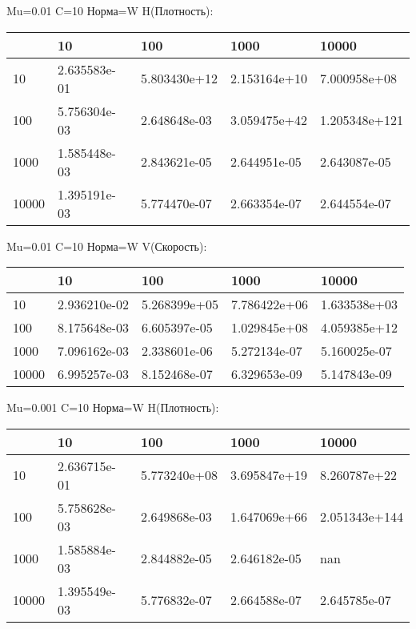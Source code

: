 \documentclass[a4paper, 12pt]{article}
\begin{document}
\bigskip
\bigskip
\bigskip


Mu=0.01  C=10 Норма=W H(Плотность):


\begin{tabular}{lllll}
\toprule
{} &         10    &         100   &         1000  &          10000 \\
\midrule
10    &  2.635583e-01 &  5.803430e+12 &  2.153164e+10 &   7.000958e+08 \\
100   &  5.756304e-03 &  2.648648e-03 &  3.059475e+42 &  1.205348e+121 \\
1000  &  1.585448e-03 &  2.843621e-05 &  2.644951e-05 &   2.643087e-05 \\
10000 &  1.395191e-03 &  5.774470e-07 &  2.663354e-07 &   2.644554e-07 \\
\bottomrule
\end{tabular}



\bigskip
\bigskip
\bigskip


Mu=0.01  C=10 Норма=W V(Скорость):


\begin{tabular}{lllll}
\toprule
{} &         10    &         100   &         1000  &         10000 \\
\midrule
10    &  2.936210e-02 &  5.268399e+05 &  7.786422e+06 &  1.633538e+03 \\
100   &  8.175648e-03 &  6.605397e-05 &  1.029845e+08 &  4.059385e+12 \\
1000  &  7.096162e-03 &  2.338601e-06 &  5.272134e-07 &  5.160025e-07 \\
10000 &  6.995257e-03 &  8.152468e-07 &  6.329653e-09 &  5.147843e-09 \\
\bottomrule
\end{tabular}



\bigskip
\bigskip
\bigskip


Mu=0.001  C=10 Норма=W H(Плотность):


\begin{tabular}{lllll}
\toprule
{} &         10    &         100   &         1000  &          10000 \\
\midrule
10    &  2.636715e-01 &  5.773240e+08 &  3.695847e+19 &   8.260787e+22 \\
100   &  5.758628e-03 &  2.649868e-03 &  1.647069e+66 &  2.051343e+144 \\
1000  &  1.585884e-03 &  2.844882e-05 &  2.646182e-05 &            nan \\
10000 &  1.395549e-03 &  5.776832e-07 &  2.664588e-07 &   2.645785e-07 \\
\bottomrule
\end{tabular}
\end{document}
